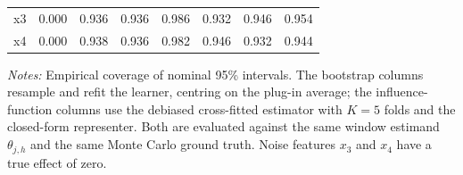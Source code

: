 \begin{table}[htbp]
\begin{threeparttable}
\begin{tabular}{lrrrrrrr}
\quad x3 & 0.000 & 0.936 & 0.936 & 0.986 & 0.932 & 0.946 & 0.954 \\
\quad x4 & 0.000 & 0.938 & 0.936 & 0.982 & 0.946 & 0.932 & 0.944 \\
\bottomrule
\end{tabular}
\begin{tablenotes}
\footnotesize
\item \textit{Notes:} Empirical coverage of nominal 95\% intervals. The bootstrap columns resample and refit the learner, centring on the plug-in average; the influence-function columns use the debiased cross-fitted estimator with $K=5$ folds and the closed-form representer. Both are evaluated against the same window estimand $\theta_{j,h}$ and the same Monte Carlo ground truth. Noise features $x_3$ and $x_4$ have a true effect of zero.
\end{tablenotes}
\end{threeparttable}
\end{table}